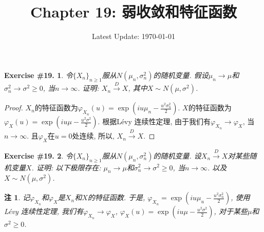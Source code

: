 \documentclass[UTF8, a4paper]{article}
\title{Chapter 19: 弱收敛和特征函数}
\author{}
\date{Latest Update: \today}
\newtheorem{exercise}{Exercise \#19.}
\newtheorem*{remark}{注}
\begin{document}
\maketitle

\begin{framed}
\begin{exercise}
令\(\{X_n\}_{n \geq 1}\)服从\(N(\mu_n, \sigma_n^2)\)的随机变量.
假设\(\mu_n \to \mu\)和\(\sigma_n^2 \to \sigma^2 \geq 0\), 当\(n \to \infty\).
证明: \(X_n \xrightarrow{D} X\), 其中\(X \sim N(\mu, \sigma^2)\).
\end{exercise}
\end{framed}

\begin{proof}
\(X_n\)的特征函数为\(\varphi_{X_n}(u) = \exp\left(iu \mu_n - \frac{u^2 \sigma_n^2}{2}\right)\).
\(X\)的特征函数为\(\varphi_X(u) = \exp\left(iu \mu - \frac{u^2 \sigma^2}{2}\right)\).
根据L\'evy 连续性定理, 由于我们有\(\varphi_{X_n} \to \varphi_X\), 当\(n \to \infty\). 
且\(\varphi_{X} \)在\(u = 0\)处连续,
所以, \(X_n \xrightarrow{D} X\).
\end{proof}


\begin{framed}
\begin{exercise}
令\(\{X_n\}_{n \geq 1}\)服从\(N(\mu_n, \sigma_n^2)\)的随机变量.
设\(X_n \xrightarrow{D} X\)对某些随机变量\(X\).
证明: 以下极限存在: \(\mu_n \to \mu\)和\(\sigma_n^2 \to \sigma^2 \geq 0\), 当\(n \to \infty\). 以及\(X \sim N(\mu, \sigma^2)\).
\end{exercise}
\end{framed}
\begin{remark}
记\(\varphi_{X_n}\)和\(\varphi_X\)是\(X_n\)和\(X\)的特征函数.
于是, \(\varphi_{X_n} = \exp\left(iu \mu_u - \frac{u^2 \sigma_n^2}{2}\right)\),
使用L\'evy 连续性定理, 我们有\(\varphi_{X_n} \to \varphi_X\), \(\varphi_X(u) = \exp\left(iu \mu - \frac{u^2 \sigma^2}{2}\right)\), 对于某些\(\mu\)和\(\sigma^2 \geq 0\).
\end{remark}
\end{document}
